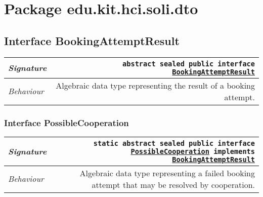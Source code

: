 

\section{Package edu.kit.hci.soli.dto}
\begin{adjustwidth}{1.5em}{0pt}
  \subsection{Interface BookingAttemptResult\label{edu.kit.hci.soli.dto.BookingAttemptResult} }
  \begin{adjustwidth}{1.5em}{0pt}
    {\begin{tabularx}{1.0\linewidth}{@{}l R@{}}
      \emph{Signature} & \texttt{abstract sealed public  interface \texttt{\hyperref[edu.kit.hci.soli.dto.BookingAttemptResult]{\texttt{BookingAttemptResult}}}} \\
      \hline
      \emph{Behaviour} & Algebraic data type representing the result of a booking attempt.  \\
      \hline
  
    \end{tabularx}}\subsubsection{Interface PossibleCooperation\label{edu.kit.hci.soli.dto.BookingAttemptResult.PossibleCooperation} }
    \begin{adjustwidth}{1.5em}{0pt}
      {\begin{tabularx}{1.0\linewidth}{@{}l R@{}}
        \emph{Signature} & \texttt{static abstract sealed public  interface \texttt{\hyperref[edu.kit.hci.soli.dto.BookingAttemptResult.PossibleCooperation]{\texttt{PossibleCooperation}} implements \texttt{\hyperref[edu.kit.hci.soli.dto.BookingAttemptResult]{\texttt{BookingAttemptResult}}}}} \\
        \hline
        \emph{Behaviour} & Algebraic data type representing a failed booking attempt that may be resolved by cooperation.  \\
        \hline
  

\end{tabularx}}
\end{adjustwidth}
\end{adjustwidth}
\end{adjustwidth}
